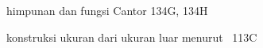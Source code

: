 \indexmedskip

himpunan dan fungsi Cantor 134G, 134H




\indexheader{\Caratheodory}
konstruksi ukuran dari ukuran luar menurut \Caratheodory~113C





































































































